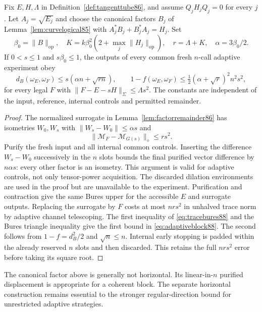 \begin{lemma}\label{lem:adaptiveblock88}
Fix $E,H,\Lambda$ in Definition~\ref{def:tangenttube86}, and assume
$Q_jH_jQ_j=0$ for every $j$.  Let $A_j=\sqrt{E_j}$ and choose the
canonical factors $B_j$ of Lemma~\ref{lem:curvelogical85} with
$A_j^*B_j+B_j^*A_j=H_j$.  Set
\[
 \beta_0=\|B\|_{\mathrm{op}},\quad
 K=k\beta_0^2(2+\max_j\|H_j\|_{\mathrm{op}}),\quad
 r=\Lambda+K,\quad \alpha=3\beta_0/2.
\]
If $0<s\le1$ and $s\beta_0\le1$, the outputs of every common fresh
$n$-call adaptive experiment obey
\begin{equation}\label{eq:adaptiveblock88}
 d_B(\omega_E,\omega_F)\le s(\alpha n+\sqrt{rn}),\qquad
 1-f(\omega_E,\omega_F)
 \le \tfrac12(\alpha+\sqrt r)^2 n^2s^2,
\end{equation}
for every legal $F$ with $\|F-E-sH\|_\Sigma\le\Lambda s^2$.
The constants are independent of the input, reference, internal
controls and permitted remainder.
\end{lemma}
\begin{proof}
The normalized surrogate in Lemma~\ref{lem:factorremainder86} has
isometries $W_0,W_s$ with $\|W_s-W_0\|\le\alpha s$ and
\[
 \|\mathcal M_F-\mathcal M_{G(s)}\|_\diamond\le rs^2.
\]
Purify the fresh input and all internal common controls.  Inserting
the difference $W_s-W_0$ successively in the $n$ slots bounds the
final purified vector difference by $n\alpha s$: every other factor
is an isometry.  This argument is valid for adaptive controls, not
only tensor-power acquisition.  The discarded dilation environments
are used in the proof but are unavailable to the experiment.
Purification and contraction give the same Bures upper for the
accessible $E$ and surrogate outputs.  Replacing the surrogate by
$F$ costs at most $nrs^2$ in unhalved trace norm by adaptive channel
telescoping.  The first inequality of \eqref{eq:tracebures88} and the
Bures triangle inequality give the first bound in
\eqref{eq:adaptiveblock88}.  The second follows from
$1-f=d_B^2/2$ and $\sqrt n\le n$.  Internal early stopping is padded
within the already reserved $n$ slots and then discarded.  This
retains the full $nrs^2$ error before taking its square root.
\end{proof}

The canonical factor above is generally not horizontal.  Its
linear-in-$n$ purified displacement is appropriate for a coherent
block.  The separate horizontal construction remains essential to
the stronger regular-direction bound for unrestricted adaptive
strategies.

